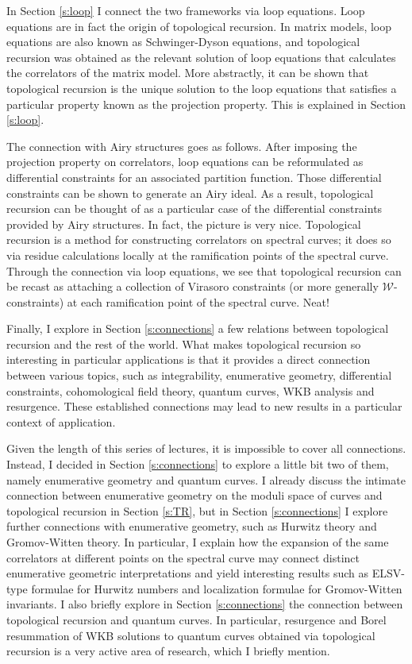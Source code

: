 \documentclass[reqno,oneside,11pt]{amsart}
\theoremstyle{plain}
\theoremstyle{definition}
\theoremstyle{remark}
\numberwithin{equation}{section}
\begin{document}
In Section \ref{s:loop} I connect the two frameworks via loop equations. Loop equations are in fact the origin of topological recursion. In matrix models, loop equations are also known as Schwinger-Dyson equations, and topological recursion was obtained as the relevant solution of loop equations that calculates the correlators of the matrix model. More abstractly, it can be shown that topological recursion is the unique solution to the loop equations that satisfies a particular property known as the projection property. This is explained in Section \ref{s:loop}. 

The connection with Airy structures goes as follows. After imposing the projection property on correlators, loop equations can be reformulated as differential constraints for an associated partition function. Those differential constraints can be shown to generate an Airy ideal. As a result, topological recursion can be thought of as a particular case of the differential constraints provided by Airy structures. In fact, the picture is very nice. Topological recursion is a method for constructing correlators on spectral curves; it does so via residue calculations locally at the ramification points of the spectral curve. Through the connection via loop equations, we see that topological recursion can be recast as attaching a collection of Virasoro constraints (or more generally $\mathcal{W}$-constraints) at each ramification point of the spectral curve. Neat!

Finally, I explore in Section \ref{s:connections} a few relations between topological recursion and the rest of the world. What makes topological recursion so interesting in particular applications is that it provides a direct connection  between various topics, such as integrability, enumerative geometry, differential constraints, cohomological field theory, quantum curves, WKB analysis and resurgence. These established connections may lead to new results in a particular context of application.

Given the length of this series of lectures, it is impossible to cover all connections. Instead, I decided in Section \ref{s:connections} to explore a little bit two of them, namely enumerative geometry and quantum curves. I already discuss the intimate connection between enumerative geometry on the moduli space of curves and topological recursion in Section \ref{s:TR}, but in Section \ref{s:connections} I explore further connections with enumerative geometry, such as Hurwitz theory and Gromov-Witten theory. In particular, I explain how the expansion of the same correlators at different points on the spectral curve may connect distinct enumerative geometric interpretations and yield interesting results such as ELSV-type formulae for Hurwitz numbers and localization formulae for Gromov-Witten invariants. I also briefly explore in Section \ref{s:connections} the connection between topological recursion and quantum curves. In particular, resurgence and Borel resummation of WKB solutions to quantum curves obtained via topological recursion is a very active area of research, which I briefly mention.
\end{document}
